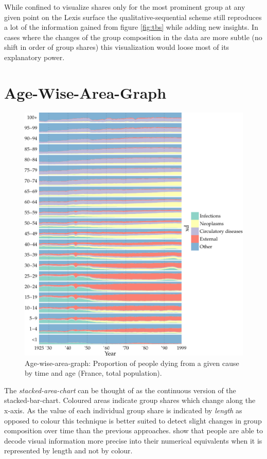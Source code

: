 \documentclass[a4paper, 12pt]{scrartcl}
\begin{document}
While confined to visualize shares only for the most prominent group at any given point on the Lexis surface the qualitative-sequential scheme still reproduces a lot of the information gained from figure \ref{fig:tbs} while adding new insights. In cases where the changes of the group composition in the data are more subtle (no shift in order of group shares) this visualization would loose most of its explanatory power.

\clearpage

\section{Age-Wise-Area-Graph} %
\label{sec:aag}

\begin{figure}[!htb]
  \centering
  \includegraphics[width = 0.85\linewidth]{../fig/plot-agewise_area.pdf}
  \caption{Age-wise-area-graph: Proportion of people dying from a given cause by time and age (France, total population).}
  \label{fig:aag}
\end{figure}

The \emph{stacked-area-chart} can be thought of as the continuous version of the stacked-bar-chart. Coloured areas indicate group shares which change along the x-axis. As the value of each individual group share is indicated by \emph{length} as opposed to colour this technique is better suited to detect slight changes in group composition over time than the previous approaches. \textcite{Cleveland1984} show that people are able to decode visual information more precise into their numerical equivalents when it is represented by length and not by colour.
\end{document}
